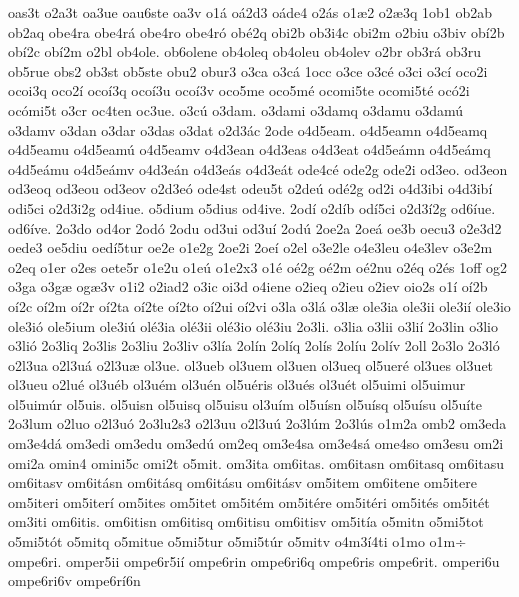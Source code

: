{oas3t
o2a3t
oa3ue
oau6ste
oa3v
o1^^e1
o^^e12d3
o^^e1de4
o2^^e1s
o1^^e62
o2^^e63q
1ob1
ob2ab
ob2aq
obe4ra
obe4r^^e1
obe4ro
obe4r^^f3
ob^^e92q
obi2b
ob3i4c
obi2m
o2biu
o3biv
ob^^ed2b
ob^^ed2c
ob^^ed2m
o2bl
ob4ole.
ob6olene
ob4oleq
ob4oleu
ob4olev
o2br
ob3r^^e1
ob3ru
ob5rue
obs2
ob3st
ob5ste
obu2
obur3
o3ca
o3c^^e1
1occ
o3ce
o3c^^e9
o3ci
o3c^^ed
oco2i
ocoi3q
oco2^^ed
oco^^ed3q
oco^^ed3u
oco^^ed3v
oco5me
oco5m^^e9
ocomi5te
ocomi5t^^e9
oc^^f32i
oc^^f3mi5t
o3cr
oc4ten
oc3ue.
o3c^^fa
o3dam.
o3dami
o3damq
o3damu
o3dam^^fa
o3damv
o3dan
o3dar
o3das
o3dat
o2d3^^e1c
2ode
o4d5eam.
o4d5eamn
o4d5eamq
o4d5eamu
o4d5eam^^fa
o4d5eamv
o4d3ean
o4d3eas
o4d3eat
o4d5e^^e1mn
o4d5e^^e1mq
o4d5e^^e1mu
o4d5e^^e1mv
o4d3e^^e1n
o4d3e^^e1s
o4d3e^^e1t
ode4c^^e9
ode2g
ode2i
od3eo.
od3eon
od3eoq
od3eou
od3eov
o2d3e^^f3
ode4st
odeu5t
o2de^^fa
od^^e92g
od2i
o4d3ibi
o4d3ib^^ed
odi5ci
o2d3i2g
od4iue.
o5dium
o5dius
od4ive.
2od^^ed
o2d^^edb
od^^ed5ci
o2d3^^ed2g
od6^^edue.
od6^^edve.
2o3do
od4or
2od^^f3
2odu
od3ui
od3u^^ed
2od^^fa
2oe2a
2oe^^e1
oe3b
oecu3
o2e3d2
oede3
oe5diu
oed^^ed5tur
oe2e
o1e2g
2oe2i
2oe^^ed
o2el
o3e2le
o4e3leu
o4e3lev
o3e2m
o2eq
o1er
o2es
oete5r
o1e2u
o1e^^fa
o1e2x3
o1^^e9
o^^e92g
o^^e92m
o^^e92nu
o2^^e9q
o2^^e9s
1off
og2
o3ga
o3g^^e6
og^^e63v
o1i2
o2iad2
o3ic
oi3d
o4iene
o2ieq
o2ieu
o2iev
oio2s
o1^^ed
o^^ed2b
o^^ed2c
o^^ed2m
o^^ed2r
o^^ed2ta
o^^ed2te
o^^ed2to
o^^ed2ui
o^^ed2vi
o3la
o3l^^e1
o3l^^e6
ole3ia
ole3ii
ole3i^^ed
ole3io
ole3i^^f3
ole5ium
ole3i^^fa
ol^^e93ia
ol^^e93ii
ol^^e93io
ol^^e93iu
2o3li.
o3lia
o3lii
o3li^^ed
2o3lin
o3lio
o3li^^f3
2o3liq
2o3lis
2o3liu
2o3liv
o3l^^eda
2ol^^edn
2ol^^edq
2ol^^eds
2ol^^edu
2ol^^edv
2oll
2o3lo
2o3l^^f3
o2l3ua
o2l3u^^e1
o2l3u^^e6
ol3ue.
ol3ueb
ol3uem
ol3uen
ol3ueq
ol5uer^^e9
ol3ues
ol3uet
ol3ueu
o2lu^^e9
ol3u^^e9b
ol3u^^e9m
ol3u^^e9n
ol5u^^e9ris
ol3u^^e9s
ol3u^^e9t
ol5uimi
ol5uimur
ol5uim^^far
ol5uis.
ol5uisn
ol5uisq
ol5uisu
ol3u^^edm
ol5u^^edsn
ol5u^^edsq
ol5u^^edsu
ol5u^^edte
2o3lum
o2luo
o2l3u^^f3
2o3lu2s3
o2l3uu
o2l3u^^fa
2o3l^^fam
2o3l^^fas
o1m2a
omb2
om3eda
om3e4d^^e1
om3edi
om3edu
om3ed^^fa
om2eq
om3e4sa
om3e4s^^e1
ome4so
om3esu
om2i
omi2a
omin4
omini5c
omi2t
o5mit.
om3ita
om6itas.
om6itasn
om6itasq
om6itasu
om6itasv
om6it^^e1sn
om6it^^e1sq
om6it^^e1su
om6it^^e1sv
om5item
om6itene
om5itere
om5iteri
om5iter^^ed
om5ites
om5itet
om5it^^e9m
om5it^^e9re
om5it^^e9ri
om5it^^e9s
om5it^^e9t
om3iti
om6itis.
om6itisn
om6itisq
om6itisu
om6itisv
om5it^^eda
o5mitn
o5mi5tot
o5mi5t^^f3t
o5mitq
o5mitue
o5mi5tur
o5mi5t^^far
o5mitv
o4m3^^ed4ti
o1mo
o1m^^f7
ompe6ri.
omper5ii
ompe6r5i^^ed
ompe6rin
ompe6ri6q
ompe6ris
ompe6rit.
omperi6u
ompe6ri6v
ompe6r^^ed6n
}
